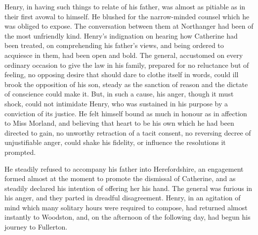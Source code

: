  Henry, in having such things to relate of his father, was almost as pitiable as in their first avowal to himself. He blushed for the narrow-minded counsel which he was obliged to expose. The conversation between them at Northanger had been of the most unfriendly kind. Henry's indignation on hearing how Catherine had been treated, on comprehending his father's views, and being ordered to acquiesce in them, had been open and bold. The general, accustomed on every ordinary occasion to give the law in his family, prepared for no reluctance but of feeling, no opposing desire that should dare to clothe itself in words, could ill brook the opposition of his son, steady as the sanction of reason and the dictate of conscience could make it. But, in such a cause, his anger, though it must shock, could not intimidate Henry, who was sustained in his purpose by a conviction of its justice. He felt himself bound as much in honour as in affection to Miss Morland, and believing that heart to be his own which he had been directed to gain, no unworthy retraction of a tacit consent, no reversing decree of unjustifiable anger, could shake his fidelity, or influence the resolutions it prompted. 

 He steadily refused to accompany his father into Herefordshire, an engagement formed almost at the moment to promote the dismissal of Catherine, and as steadily declared his intention of offering her his hand. The general was furious in his anger, and they parted in dreadful disagreement. Henry, in an agitation of mind which many solitary hours were required to compose, had returned almost instantly to Woodston, and, on the afternoon of the following day, had begun his journey to Fullerton. 
